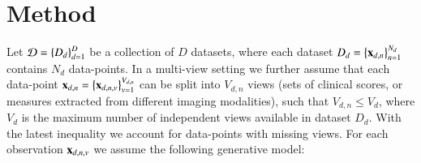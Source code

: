 \section{Method}



Let $\mathcal{D} = \left\{D_d\right\}_{d=1}^D$ be a collection of $D$ datasets, where each dataset $D_d = \left\{\mathbf{x}_{d,n}\right\}_{n=1}^{N_d}$ contains $N_d$ data-points.
In a multi-view setting we further assume that each data-point $\mathbf{x}_{d,n} = \left\{\mathbf{x}_{d,n,v}\right\}_{v=1}^{V_{d,n}}$ can be split into $V_{d,n}$ views (\eg sets of clinical scores, or measures extracted from different imaging modalities),
such that $V_{d,n} \leq V_d$, where $V_d$ is the maximum number of independent views available in dataset $D_d$.
With the latest inequality we account for data-points with missing views.
For each observation $\mathbf{x}_{d,n,v}$ we assume the following generative model:

